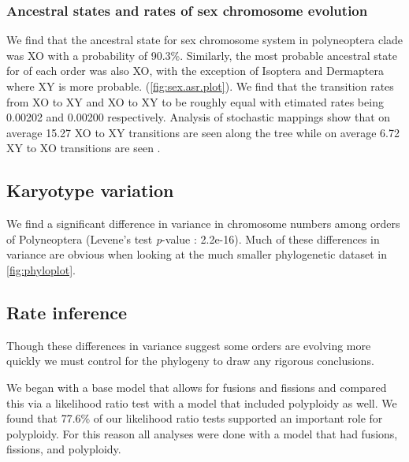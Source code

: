 

\subsubsection{Ancestral states and rates of sex chromosome evolution}

We find that the ancestral state for sex chromosome system in polyneoptera clade was XO with a probability of 90.3\%.
Similarly, the most probable ancestral state for of each order was also XO, with the exception of Isoptera and Dermaptera where XY is more probable.
(\cref{fig:sex.asr.plot}).
We find that the transition rates from XO to XY and XO to XY to be roughly equal with etimated rates being 0.00202 and 0.00200 respectively. %
Analysis of stochastic mappings show that on average 15.27 XO to XY transitions are seen along the tree while on average 6.72 XY to XO transitions are seen . %

\subsection{Karyotype variation}
We find a significant difference in variance in chromosome numbers among orders of Polyneoptera (Levene's test \textit{p}-value : 2.2e-16). %
Much of these differences in variance are obvious when looking at the much smaller phylogenetic dataset in \cref{fig:phyloplot}.

\subsection{Rate inference}
Though these differences in variance suggest some orders are evolving more quickly we must control for the phylogeny to draw any rigorous conclusions.

We began with a base model that allows for fusions and fissions and compared this via a likelihood ratio test with a model that included polyploidy as well.
We found that 77.6\% of our likelihood ratio tests supported an important role for polyploidy.
For this reason all analyses were done with a model that had fusions, fissions, and polyploidy.

